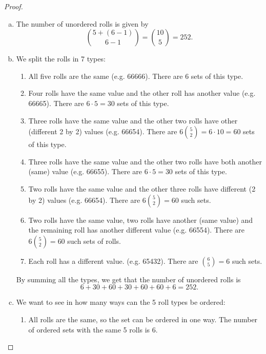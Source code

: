 \begin{proof}
    \hfill
    \begin{enumerate}[(a)]
        \item The number of unordered rolls is given by 
            \[
                \binom{5 + (6 - 1)}{6 - 1} = \binom{10}{5} = 252
            .\] 

        \item We split the rolls in 7 types:
            \begin{enumerate}[(1)]
                \item All five rolls are the same (e.g. 66666). There are 6 sets of this type.

                \item Four rolls have the same value and the other roll has another value (e.g. 66665).
                    There are $6 \cdot 5 = 30$ sets of this type.
                
                \item Three rolls have the same value and the other two rolls have other (different 2 by 2)
                    values (e.g. 66654). There are  $6 \binom{5}{2} = 6 \cdot 10 = 60$ sets of this type.

                \item Three rolls have the same value and the other two rolls have both another (same) value 
                    (e.g. 66655). There are $6 \cdot 5 = 30$ sets of this type.

                \item Two rolls have the same value and the other three rolls have different (2 by 2) values
                    (e.g. 66654). There are $6 \binom{5}{2} = 60$ such sets.

                \item Two rolls have the same value, two rolls have another (same value) and the 
                    remaining roll has another different value (e.g. 66554). 
                    There are $6 \binom{5}{2} = 60$ such sets of rolls.

                \item Each roll has a different value. (e.g. 65432). There are $\binom{6}{5} = 6$ such sets.
            \end{enumerate}

        By summing all the types, we get that the number of unordered rolls is 
        \[
            6 + 30 + 60 + 30 + 60 + 60 + 6 = 252
        .\] 

    \item We want to see in how many ways can the 5 roll types be ordered:
        \begin{enumerate}[(1)]
            \item All rolls are the same, so the set can be ordered in one way. The number of 
                ordered sets with the same 5 rolls is 6.


\end{enumerate}
\end{enumerate}
\end{proof}

